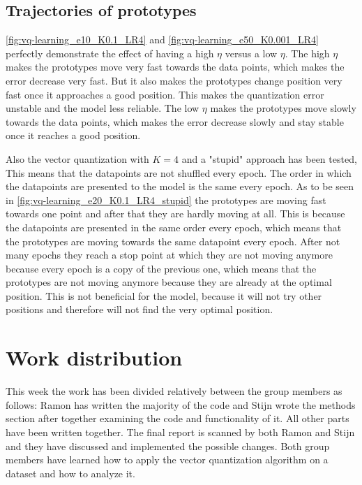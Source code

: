 \documentclass[twoside, a4paper, fleqn, reqno]{article}
\begin{document}
\subsection*{Trajectories of prototypes}

\autoref{fig:vq-learning_e10_K0.1_LR4} and \autoref{fig:vq-learning_e50_K0.001_LR4} perfectly demonstrate the effect of having a high $\eta$
versus a low $\eta$. The high $\eta$ makes the prototypes move very fast towards the data points, which makes the error decrease very fast.
But it also makes the prototypes change position very fast once it approaches a good position. This makes the quantization error unstable and the model less reliable.
The low $\eta$ makes the prototypes move slowly towards the data points, which makes the error decrease slowly and stay stable once it reaches a good position.

Also the vector quantization with $K=4$ and a "stupid" approach has been tested,
This means that the datapoints are not shuffled every epoch. The order in which the datapoints are presented to the model is the same every epoch.
As to be seen in \autoref{fig:vq-learning_e20_K0.1_LR4_stupid} the prototypes are moving fast towards one point and after that they are hardly moving at all.
This is because the datapoints are presented in the same order every epoch, which means that the prototypes are moving towards the same datapoint every epoch.
After not many epochs they reach a stop point at which they are not moving anymore because every epoch is a copy of the previous one,
which means that the prototypes are not moving anymore because they are already at the optimal position.
This is not beneficial for the model, because it will not try other positions and therefore will not find the very optimal position.

\section{Work distribution}
This week the work has been divided relatively between the group members as follows:
Ramon has written the majority of the code and Stijn wrote the methods section after together examining the code and functionality of it.
All other parts have been written together. The final report is scanned by both Ramon and Stijn and they have discussed and implemented the possible changes.
Both group members have learned how to apply the vector quantization algorithm on a dataset and how to analyze it.
\end{document}
